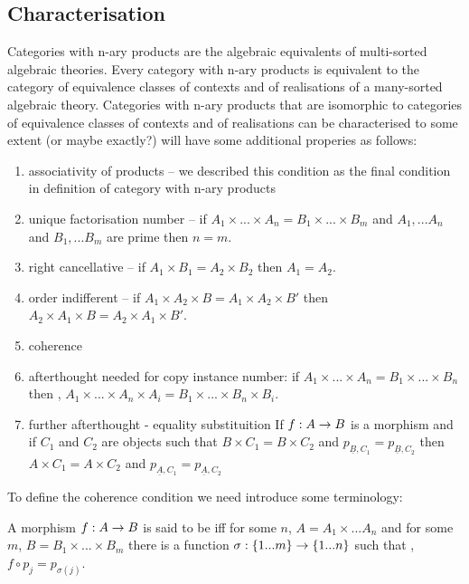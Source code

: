 \documentclass[10pt,a4paper]{scrartcl}
\begin{document}
\subsection{Characterisation}
Categories with n-ary products are the algebraic equivalents of multi-sorted algebraic theories.
Every category with n-ary products is equivalent to the category of equivalence classes 
of contexts and of realisations of a many-sorted algebraic theory. Categories with n-ary products that are isomorphic to categories of equivalence classes 
of contexts and of realisations can be characterised to some extent (or maybe exactly?)
will have some additional properies as follows:
\begin{enumerate}
\item associativity of products -- we described this condition as the final condition in definition of category with n-ary products
\item unique factorisation number -- if $A_1 \times ... \times A_n=B_1 \times ... \times B_m$
and $A_1,...A_n$ and $B_1,...B_m$ are prime then $n=m$.
\item right cancellative -- if $A_1 \times B_1 = A_2 \times B_2$ then $A_1 = A_2$. 
\item order indifferent -- if $A_1 \times A_2 \times B = A_1 \times A_2 \times B'$ then
$A_2 \times A_1 \times B = A_2 \times A_1 \times B'$.
\item coherence
\item afterthought needed for copy instance number:
if $A_1 \times ... \times A_n=B_1 \times ... \times B_n$ then \foreachi, 
$A_1 \times ... \times A_n \times A_i = B_1 \times ... \times B_n \times B_i$.

\item further afterthought - equality substituition 
If $f: A \rightarrow B$ is a morphism and if $C_1$ and $C_2$ are objects such that
$B \times C_1=B \times C_2$ and $p_{\underline{B},C_1}=p_{\underline{B},C_2}$ then
$A \times C_1=A \times C_2$ and $p_{\underline{A},C_1}=p_{\underline{A},C_2}$
\end{enumerate}

To define the coherence condition we need introduce some terminology:

\begin{definition}
A morphism $f:A \rightarrow B$ is said to be  iff for some $n$,
$A=A_1 \times ... A_n$ and for some $m$, $B=B_1 \times ... \times B_m$
 there is a function 
$\sigma: \left\{1...m\right\} \rightarrow \left\{1...n\right\}$               
such that \foreachj, $f \circ p_j = p_{\sigma(j)}$. 
\end{definition}
\end{document}
